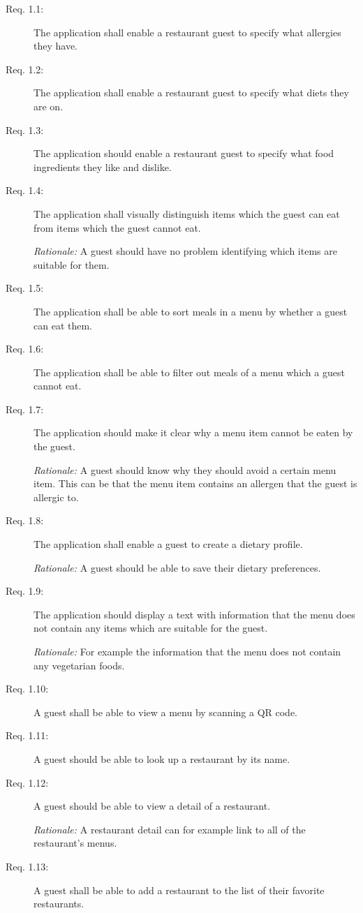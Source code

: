 \begin{description}
    \item [Req. 1.1:] The application shall enable a restaurant guest to specify what allergies they have.
    \item [Req. 1.2:] The application shall enable a restaurant guest to specify what diets they are on.
    \item [Req. 1.3:] The application should enable a restaurant guest to specify what food ingredients they like and dislike.
    \item [Req. 1.4:] The application shall visually distinguish items which the guest can eat from items which the guest cannot eat.

    \emph{Rationale:} A guest should have no problem identifying which items are suitable for them. 
    \item [Req. 1.5:] The application shall be able to sort meals in a menu by whether a guest can eat them.
    \item [Req. 1.6:] The application shall be able to filter out meals of a menu which a guest cannot eat.
    \item [Req. 1.7:] The application should make it clear why a menu item cannot be eaten by the guest.

    \emph{Rationale:} A guest should know why they should avoid a certain menu item. This can be that the menu item contains an allergen that the guest is allergic to. 
    \item [Req. 1.8:] The application shall enable a guest to create a dietary profile.

    \emph{Rationale:} A guest should be able to save their dietary preferences.
    \item [Req. 1.9:] The application should display a text with information that the menu does not contain any items which are suitable for the guest.

    \emph{Rationale:} For example the information that the menu does not contain any vegetarian foods.
    \item [Req. 1.10:] A guest shall be able to view a menu by scanning a QR code.
    \item [Req. 1.11:] A guest should be able to look up a restaurant by its name.
    \item [Req. 1.12:] A guest should be able to view a detail of a restaurant.

    \emph{Rationale:} A restaurant detail can for example link to all of the restaurant's menus. 
    \item [Req. 1.13:] A guest shall be able to add a restaurant to the list of their favorite restaurants.
    

\end{description}
